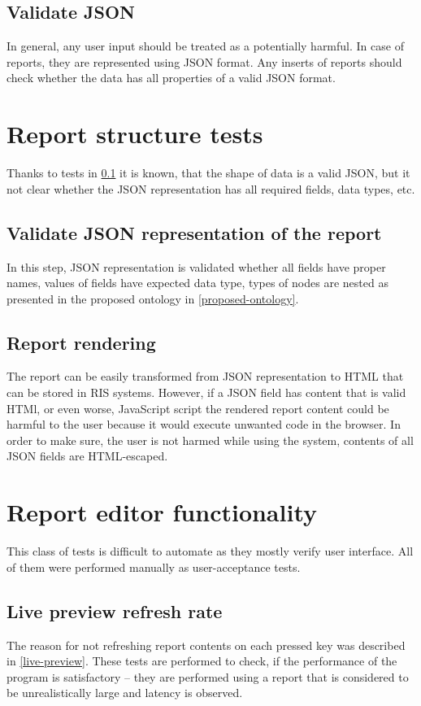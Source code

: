 \documentclass[12pt, twoside, openany]{report}
\theoremstyle{definition}
\begin{document}
\subsection{Validate JSON} \label{valid-json}
	In general, any user input should be treated as a potentially harmful. In case of reports, they are represented using JSON format. Any inserts of reports should check whether the data has all properties of a valid JSON format.
	
\section{Report structure tests}
	Thanks to tests in \ref{valid-json} it is known, that the shape of data is a valid JSON, but it not clear whether the JSON representation has all required fields, data types, etc.

	\subsection{Validate JSON representation of the report}
		In this step, JSON representation is validated whether all fields have proper names, values of fields have expected data type, types of nodes are nested as presented in the proposed ontology in \ref{proposed-ontology}.
	\subsection{Report rendering}
		The report can be easily transformed from JSON representation to HTML that can be stored in RIS systems. However, if a JSON field has content that is valid HTMl, or even worse, JavaScript script the rendered report content could be harmful to the user because it would execute unwanted code in the browser. In order to make sure, the user is not harmed while using the system, contents of all JSON fields are HTML-escaped.

\section{Report editor functionality}
	This class of tests is difficult to automate as they mostly verify user interface. All of them were performed manually as user-acceptance tests.
	\subsection{Live preview refresh rate}
	The reason for not refreshing report contents on each pressed key was described in \ref{live-preview}. These tests are performed to check, if the performance of the program is satisfactory – they are performed using a report that is considered to be unrealistically large and latency is observed. 
\end{document}
